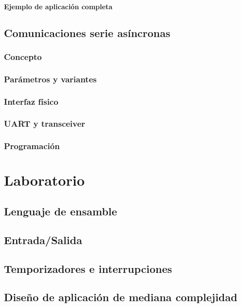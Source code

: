 \documentclass[a4paper]{book}
\begin{document}
\subsubsection{Ejemplo de aplicación completa}

\section{Comunicaciones serie asíncronas}

\subsection{Concepto}

\subsection{Parámetros y variantes}

\subsection{Interfaz físico}

\subsection{UART y transceiver}

\subsection{Programación}

\chapter{Laboratorio}

\section{Lenguaje de ensamble}

\section{Entrada/Salida}

\section{Temporizadores e interrupciones}

\section{Diseño de aplicación de mediana complejidad}



% 
\end{document}
